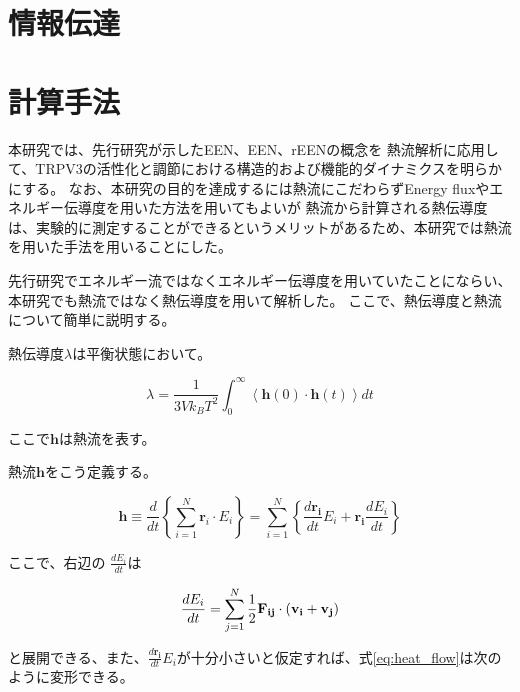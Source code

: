 
\section{情報伝達}

\section{計算手法}
本研究では、先行研究が示したEEN、\Delta EEN、r\Delta EENの概念\autocite{ishikuraEnergyExchangeNetwork2015,ota_energy_2019,poudel_energy_2022}を
熱流解析に応用して、TRPV3の活性化と調節における構造的および機能的ダイナミクスを明らかにする。
なお、本研究の目的を達成するには熱流にこだわらずEnergy fluxやエネルギー伝導度を用いた方法を用いてもよいが
熱流から計算される熱伝導度は、実験的に測定することができるというメリットがあるため、本研究では熱流を用いた手法を用いることにした。

先行研究でエネルギー流ではなくエネルギー伝導度を用いていたことにならい、本研究でも熱流ではなく熱伝導度を用いて解析した。
ここで、熱伝導度と熱流について簡単に説明する。

熱伝導度$\lambda$は平衡状態において。

\begin{equation}
  \label{eq:thermal_conductivity}
  \lambda = \frac{1}{3Vk_B T^2} \int_{0}^{\infty} \left\langle
    \bm{h}(0) \cdot \bm{h}(t)
  \right\rangle dt
\end{equation}

ここで$\mathbf{h}$は熱流を表す。\autocite{mcquarrie_statistical_2000}

熱流$\mathbf{h}$をこう定義する。

\begin{equation}
  \label{eq:heat_flow}
  \bm{h} \equiv \frac{d}{dt} \left\{
    \sum_{i=1}^{N} \bm{r}_i \cdot E_i
  \right\} = \sum_{i=1}^{N} \left\{
    \frac{d\bm{r_i}}{dt}E_i + \bm{r_i}\frac{dE_i}{dt}
  \right\}
\end{equation}

ここで、右辺の $\frac{dE_i}{dt}$は

\begin{equation}
  \label{time_derivative_of_energy}
  \frac{dE_i}{dt} = \sum_{j=1}^{N} \frac{1}{2} \bf{F}_{ij} \cdot (\bf{v}_i + \bf{v}_j)
\end{equation}

と展開できる\autocite{leitner_mapping_2018}、また、$\frac{d\bm{r_i}}{dt}E_{i}$が十分小さいと仮定すれば、式\ref{eq:heat_flow}は次のように変形できる。\autocite{yamatoComputationalStudyThermal2022,oai:nagoya.repo.nii.ac.jp:02007698}

